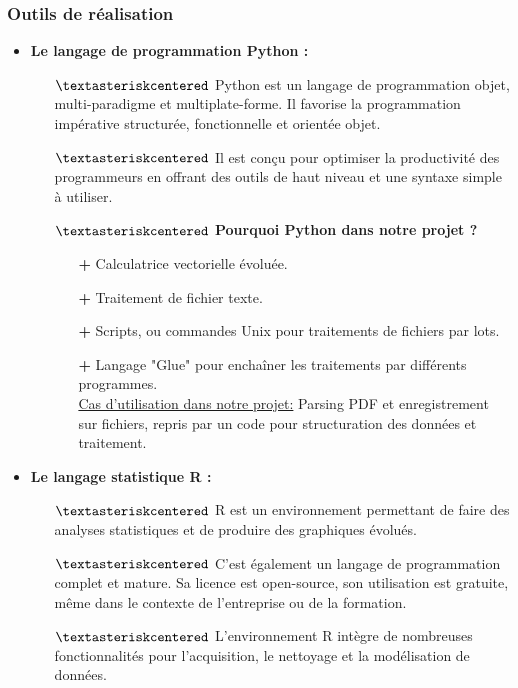 	\subsubsection{Outils de réalisation}
		\begin{itemize}
			\item
			\textbf{Le langage de programmation Python : } 
				\begin{itemize}
					\item[$\textasteriskcentered$] Python est un langage de programmation objet, multi-paradigme et multiplate-forme. Il favorise la programmation impérative structurée, fonctionnelle et orientée objet.
					\item[$\textasteriskcentered$] Il est conçu pour optimiser la productivité des programmeurs en offrant des outils de haut niveau et une syntaxe simple à utiliser.
					\item[$\textasteriskcentered$] \textbf{Pourquoi Python dans notre projet ?}
					\begin{itemize}
						\item[\textbf{+}] Calculatrice vectorielle évoluée.
						\item[\textbf{+}] Traitement de fichier texte.
						\item[\textbf{+}] Scripts, ou commandes Unix pour traitements de fichiers par lots.
						\item[\textbf{+}] Langage "Glue" pour enchaîner les traitements par différents programmes.\\\underline{Cas d'utilisation dans notre projet:} Parsing PDF et enregistrement sur fichiers, repris par un code pour structuration des données et traitement.
					\end{itemize}
				\end{itemize}
			\item
			\textbf{Le langage statistique R : } 
				\begin{itemize}
					\item[$\textasteriskcentered$] R est un environnement permettant de faire des analyses statistiques et de produire des graphiques évolués.
					\item[$\textasteriskcentered$] C’est également un langage de programmation complet et mature. Sa licence est open-source, son utilisation est gratuite, même dans le contexte de l’entreprise ou de la formation.
					\item[$\textasteriskcentered$] L’environnement R intègre de nombreuses fonctionnalités pour l'acquisition, le nettoyage et la modélisation de données.

\end{itemize}
\end{itemize}

